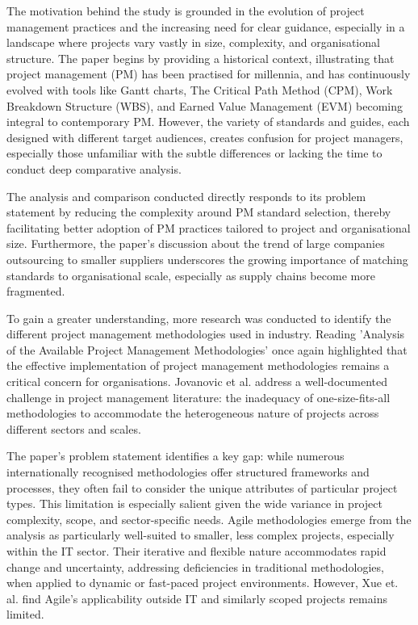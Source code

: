 \documentclass{report}
\begin{document}
The motivation behind the study is grounded in the evolution of project management practices and the increasing need for clear guidance, especially in a landscape where projects vary vastly in size, complexity, and organisational structure. The paper begins by providing a historical context, illustrating that project management (PM) has been practised for millennia, and has continuously evolved with tools like Gantt charts, The Critical Path Method (CPM), Work Breakdown Structure (WBS), and Earned Value Management (EVM) becoming integral to contemporary PM. However, the variety of standards and guides, each designed with different target audiences, creates confusion for project managers, especially those unfamiliar with the subtle differences or lacking the time to conduct deep comparative analysis.

The analysis and comparison conducted directly responds to its problem statement by reducing the complexity around PM standard selection, thereby facilitating better adoption of PM practices tailored to project and organisational size. Furthermore, the paper's discussion about the trend of large companies outsourcing to smaller suppliers underscores the growing importance of matching standards to organisational scale, especially as supply chains become more fragmented.

To gain a greater understanding, more research was conducted to identify the different project management methodologies used in industry. Reading 'Analysis of the Available Project Management Methodologies' \parencite{jovanovicAnalysisAvailableProject2018} once again highlighted that the effective implementation of project management methodologies remains a critical concern for organisations. Jovanovic et al. address a well-documented challenge in project management literature: the inadequacy of one-size-fits-all methodologies to accommodate the heterogeneous nature of projects across different sectors and scales.

The paper's problem statement identifies a key gap: while numerous internationally recognised methodologies offer structured frameworks and processes, they often fail to consider the unique attributes of particular project types. This limitation is especially salient given the wide variance in project complexity, scope, and sector-specific needs. Agile methodologies emerge from the analysis as particularly well-suited to smaller, less complex projects, especially within the IT sector. Their iterative and flexible nature accommodates rapid change and uncertainty, addressing deficiencies in traditional methodologies, when applied to dynamic or fast-paced project environments. However, Xue et. al. find Agile's applicability outside IT and similarly scoped projects remains limited.
\end{document}
